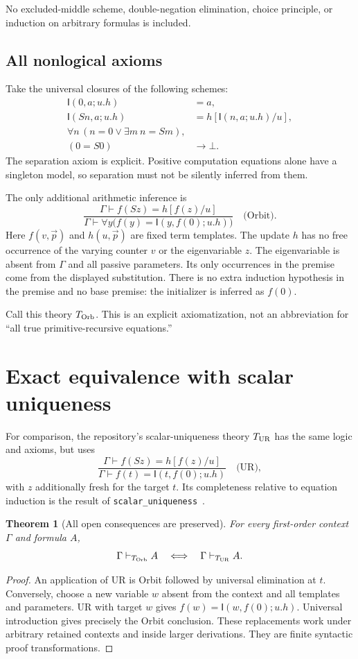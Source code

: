 \documentclass[11pt]{article}
\newtheorem{theorem}{Theorem}[section]
\theoremstyle{definition}
\newcommand{\Tur}{T_{\rm UR}}
\newcommand{\Tor}{T_{\rm Orb}}
\newcommand{\I}{\mathsf I}
\newcommand{\G}{\Gamma}
\begin{document}
No excluded-middle scheme, double-negation elimination, choice principle, or induction on arbitrary formulas is included.

\subsection{All nonlogical axioms}

Take the universal closures of the following schemes:
\begin{align}
 \I(0,a;u.h)&=a,\tag{C0}\label{eq:c0}\\
 \I(Sn,a;u.h)&=h[\I(n,a;u.h)/u],\tag{CS}\label{eq:cs}\\
 \forall n\,(n=0\lor\exists m\ n=Sm),&\tag{Cov}\label{eq:cov}\\
 (0=S0)&\to\bot.\tag{Sep}\label{eq:sep}
\end{align}
The separation axiom is explicit. Positive computation equations alone have a singleton model, so separation must not be silently inferred from them.

The only additional arithmetic inference is
\[
 \boxed{
 \frac{\G\vdash f(Sz)=h[f(z)/u]}
      {\G\vdash\forall y\bigl(f(y)=\I(y,f(0);u.h)\bigr)}
 }\quad\text{(Orbit).}
\label{rule:orbit}
\]
Here $f(v,\vec p)$ and $h(u,\vec p)$ are fixed term templates. The update $h$ has no free occurrence of the varying counter $v$ or the eigenvariable $z$. The eigenvariable is absent from $\G$ and all passive parameters. Its only occurrences in the premise come from the displayed substitution. There is no extra induction hypothesis in the premise and no base premise: the initializer is inferred as $f(0)$.

Call this theory $\Tor$. This is an explicit axiomatization, not an abbreviation for ``all true primitive-recursive equations.''

\section{Exact equivalence with scalar uniqueness}
\label{sec:equivalence}

For comparison, the repository's scalar-uniqueness theory $\Tur$ has the same logic and axioms, but uses
\[
 \frac{\G\vdash f(Sz)=h[f(z)/u]}
      {\G\vdash f(t)=\I(t,f(0);u.h)}\quad\text{(UR)},
\]
with $z$ additionally fresh for the target $t$. Its completeness relative to equation induction is the result of \texttt{scalar\_uniqueness}~\cite{ur}.

\begin{theorem}[All open consequences are preserved]
For every first-order context $\G$ and formula $A$,
\[
 \G\vdash_{\Tor}A\quad\Longleftrightarrow\quad\G\vdash_{\Tur}A.
\]
\end{theorem}
\begin{proof}
An application of UR is Orbit followed by universal elimination at $t$. Conversely, choose a new variable $w$ absent from the context and all templates and parameters. UR with target $w$ gives $f(w)=\I(w,f(0);u.h)$. Universal introduction gives precisely the Orbit conclusion. These replacements work under arbitrary retained contexts and inside larger derivations. They are finite syntactic proof transformations.
\end{proof}
\end{document}
